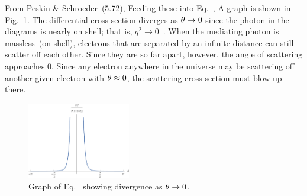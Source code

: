{	From Peskin \& Schroeder~(5.72),
	Feeding these into Eq.~,
	A graph is shown in Fig.~\ref{f2}.  The differential cross section diverges as $\theta \to 0$ since the photon in the diagrams is nearly on shell; that is, $q^2 \to 0$~\cite[p.~155]{Peskin}.  When the mediating photon is massless~(on shell), electrons that are separated by an infinite distance can still scatter off each other.  Since they are so far apart, however, the angle of scattering approaches 0.  Since any electron anywhere in the universe may be scattering off another given electron with $\theta \approx 0$, the scattering cross section must blow up there.
	
	\begin{figure} \centering
		\includegraphics[width=0.4\textwidth]{2}
		\caption{Graph of Eq.~ showing divergence as $\theta \to 0$.}
		\label{f2}
	\end{figure}
	
	\bigskip\bigskip\bigskip
}
